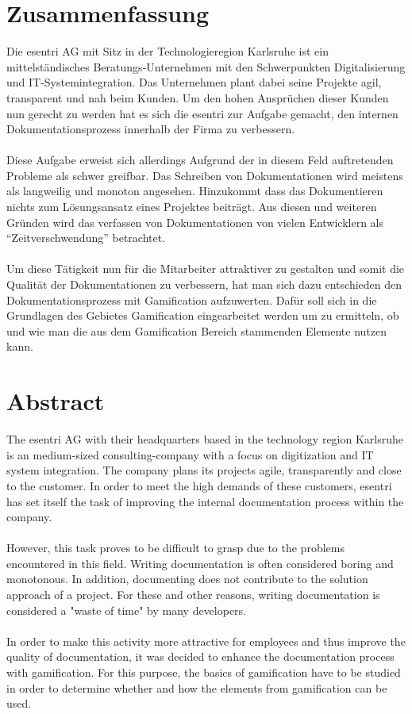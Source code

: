 \documentclass[a4paper,12pt]{scrartcl}
\begin{document}
\section*{Zusammenfassung}
Die esentri AG mit Sitz in der Technologieregion Karlsruhe ist ein mittelständisches Beratungs-Unternehmen mit den Schwerpunkten Digitalisierung und IT-Systemintegration. 
Das Unternehmen plant dabei seine Projekte agil, transparent und nah beim Kunden.
Um den hohen Ansprüchen dieser Kunden nun gerecht zu werden hat es sich die esentri zur Aufgabe gemacht, den internen Dokumentationsprozess innerhalb der Firma zu verbessern. 
\\\\
Diese Aufgabe erweist sich allerdings Aufgrund der in diesem Feld auftretenden Probleme als schwer greifbar. Das Schreiben von Dokumentationen wird meistens als langweilig und monoton angesehen. Hinzukommt dass das Dokumentieren nichts zum Lösungsansatz eines Projektes beiträgt. Aus diesen und weiteren Gründen wird das verfassen von Dokumentationen von vielen Entwicklern als “Zeitverschwendung” betrachtet. 
\\\\
Um diese Tätigkeit nun für die Mitarbeiter attraktiver zu gestalten und somit die Qualität der Dokumentationen zu verbessern, hat man sich dazu entschieden den Dokumentationsprozess mit Gamification aufzuwerten. Dafür soll sich in die Grundlagen des Gebietes Gamification eingearbeitet werden um zu ermitteln, ob und wie man die aus dem Gamification Bereich stammenden Elemente nutzen kann.


\section*{Abstract}
The esentri AG with their headquarters based in the technology region Karlsruhe is an medium-sized consulting-company with a focus on digitization and IT system integration. The company plans its projects agile, transparently and close to the customer. In order to meet the high demands of these customers, esentri has set itself the task of improving the internal documentation process within the company. 
\\\\
However, this task proves to be difficult to grasp due to the problems encountered in this field. Writing documentation is often considered boring and monotonous. In addition, documenting does not contribute to the solution approach of a project. For these and other reasons, writing documentation is considered a "waste of time" by many developers. 
\\\\
In order to make this activity more attractive for employees and thus improve the quality of documentation, it was decided to enhance the documentation process with gamification. For this purpose, the basics of gamification have to be studied in order to determine whether and how the elements from gamification can be used.     
\newpage
\thispagestyle{empty}
\tableofcontents
\thispagestyle{empty}
\newpage

\end{document}
